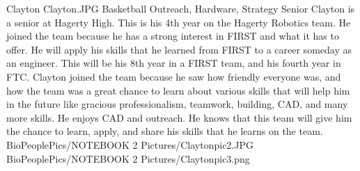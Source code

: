 \insertbio
{Clayton}
{Clayton.JPG}
{Basketball}
{Outreach, Hardware, Strategy}
{Senior}
{
Clayton is a senior at Hagerty High. This is his 4th year on the Hagerty Robotics team. He joined the team because he has a strong interest in FIRST and what it has to offer. He will apply his skills that he learned from FIRST to a career someday as an engineer. This will be his 8th year in a FIRST team, and his fourth year in FTC. Clayton joined the team because he saw how friendly everyone was, and how the team was a great chance to learn about various skills that will help him in the future like gracious professionalism, teamwork, building, CAD, and many more skills. He enjoys CAD and outreach. He knows that this team will give him the chance to learn, apply, and share his skills that he learns on the team.
}
{BioPeoplePics/NOTEBOOK 2 Pictures/Claytonpic2.JPG}
{BioPeoplePics/NOTEBOOK 2 Pictures/Claytonpic3.png}
